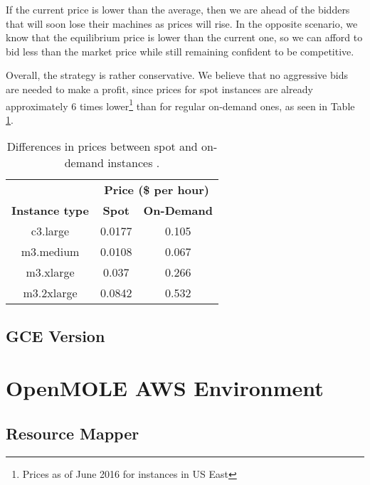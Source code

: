 If the current price is lower than the average, then we are ahead of the bidders that will soon lose their machines as prices will rise. In the opposite scenario, we know that the equilibrium price is lower than the current one, so we can afford to bid less than the market price while still remaining confident to be competitive.

Overall, the strategy is rather conservative. We believe that no aggressive bids are needed to make a profit, since prices for spot instances are already approximately 6 times lower\footnote{Prices as of June 2016 for instances in US East} than for regular on-demand ones, as seen in Table \ref{SpotPricing}.

\begin{table}[h]
\centering
\begin{tabular}{ccc}
\multicolumn{1}{l}{} & \multicolumn{2}{c}{\textbf{Price (\$ per hour)}} \\ \cline{2-3} 
\multicolumn{1}{c|}{\textbf{Instance type}} & \multicolumn{1}{c|}{\textbf{Spot}} & \multicolumn{1}{c|}{\textbf{On-Demand}} \\ \hline
\multicolumn{1}{|c|}{c3.large} & \multicolumn{1}{c|}{0.0177} & \multicolumn{1}{c|}{0.105} \\ \hline
\multicolumn{1}{|c|}{m3.medium} & \multicolumn{1}{c|}{0.0108} & \multicolumn{1}{c|}{0.067} \\ \hline
\multicolumn{1}{|c|}{m3.xlarge} & \multicolumn{1}{c|}{0.037} & \multicolumn{1}{c|}{0.266} \\ \hline
\multicolumn{1}{|c|}{m3.2xlarge} & \multicolumn{1}{c|}{0.0842} & \multicolumn{1}{c|}{0.532} \\ \hline
\end{tabular}
\caption{Differences in prices between spot and on-demand instances \cite{AWSPricing}.}
\label{SpotPricing}
\end{table}

\subsection{GCE Version}

\section{OpenMOLE AWS Environment}

\subsection{Resource Mapper}

